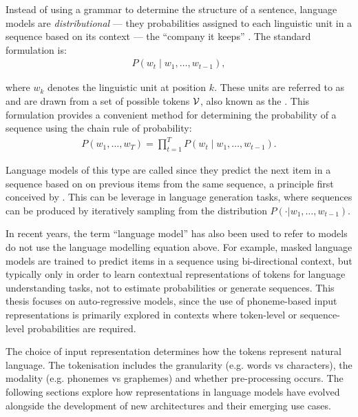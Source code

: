 
Instead of using a grammar to determine the structure of a sentence, language models are \emph{distributional} --- they probabilities assigned to each linguistic unit in a sequence based on its context --- the ``company it keeps'' \citep{firth1957synopsis}. The standard formulation is:
\begin{align}
    P\left(w_t \mid w_1, \dots, w_{t-1} \right), \label{eq:languagemodel}
\end{align}

where $w_k$ denotes the linguistic unit at position $k$. These units are referred to as  and are drawn from a set of possible tokens $\mathcal{V}$, also known as the . This formulation provides a convenient method for determining the probability of a sequence using the chain rule of probability:
\begin{align}
    P(w_1, \dots, w_T) = \prod_{t=1}^{T} P\left(w_t \mid w_1, \dots, w_{t-1}\right).
\end{align}


Language models of this type are called  since they predict the next item in a sequence based on on previous items from the same sequence, a principle first conceived by \citet{shannon1948mathematical}. This can be leverage in language generation tasks, where sequences can be produced by iteratively sampling from the distribution $P(\cdot | w_1, \dots, w_{t-1})$.


In recent years, the term ``language model'' has also been used to refer to models do not use the language modelling equation above. For example, masked language models \citep[MLM;][]{devlin2019bert} are trained to predict items in a sequence using bi-directional context, but typically only in order to learn contextual representations of tokens for language understanding tasks, not to estimate probabilities or generate sequences. This thesis focuses on auto-regressive models, since the use of phoneme-based input representations is primarily explored in contexts where token-level or sequence-level probabilities are required.

The choice of input representation determines how the tokens represent natural language. The tokenisation includes the granularity (e.g. words vs characters), the modality (e.g. phonemes vs graphemes) and whether pre-processing occurs. The following sections explore how representations in language models have evolved alongside the development of new architectures and their emerging use cases.


